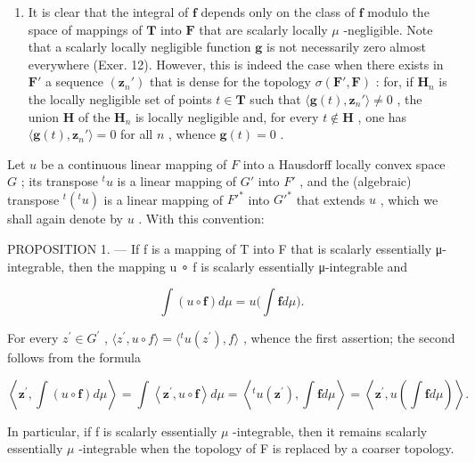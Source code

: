 \begin{enumerate}
\def\labelenumi{\arabic{enumi})}
\setcounter{enumi}{1}
\tightlist
\item
  It is clear that the integral of \(\mathbf{f}\) depends only on the class of \(\mathbf{f}\) modulo the space of mappings of \(\mathbf{T}\) into \(\mathbf{F}\) that are scalarly locally \(\mu\) -negligible. Note that a scalarly locally negligible function \(\mathbf{g}\) is not necessarily zero almost everywhere (Exer. 12). However, this is indeed the case when there exists in \(\mathbf{F}'\) a sequence \((\mathbf{z}_n')\) that is dense for the topology \(\sigma(\mathbf{F}',\mathbf{F})\) : for, if \(\mathbf{H}_n\) is the locally negligible set of points \(t \in \mathbf{T}\) such that \(\langle \mathbf{g}(t), \mathbf{z}_n' \rangle \neq 0\) , the union \(\mathbf{H}\) of the \(\mathbf{H}_n\) is locally negligible and, for every \(t \notin \mathbf{H}\) , one has \(\langle \mathbf{g}(t), \mathbf{z}_n' \rangle = 0\) for all \(n\) , whence \(\mathbf{g}(t) = 0\) .
\end{enumerate}

Let \(u\) be a continuous linear mapping of \(F\) into a Hausdorff locally convex space \(G\) ; its transpose \(^{t}u\) is a linear mapping of \(G'\) into \(F'\) , and the (algebraic) transpose \(^{t}(^{t}u)\) is a linear mapping of \(F'^{*}\) into \(G'^{*}\) that extends \(u\) , which we shall again denote by \(u\) . With this convention:

PROPOSITION 1. --- If f is a mapping of T into F that is scalarly essentially μ-integrable, then the mapping u ∘ f is scalarly essentially μ-integrable and

\[
\int (u \circ \mathbf {f}) d \mu = u \Big (\int \mathbf {f} d \mu \Big).
\]

For every \(z^{\prime} \in G^{\prime}\) , \(\langle z^{\prime}, u \circ f \rangle = \langle {}^{t} u(z^{\prime}), f \rangle\) , whence the first assertion; the second follows from the formula

\[
\left\langle \mathbf {z} ^ {\prime}, \int (u \circ \mathbf {f}) d \mu \right\rangle = \int \left\langle \mathbf {z} ^ {\prime}, u \circ \mathbf {f} \right\rangle d \mu = \left\langle {} ^ {t} u (\mathbf {z} ^ {\prime}), \int \mathbf {f} d \mu \right\rangle = \left\langle \mathbf {z} ^ {\prime}, u \left(\int \mathbf {f} d \mu\right) \right\rangle .
\]

In particular, if f is scalarly essentially \(\mu\) -integrable, then it remains scalarly essentially \(\mu\) -integrable when the topology of F is replaced by a coarser topology.

